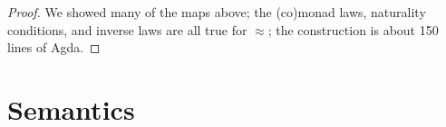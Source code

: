 \documentclass{drl-common/llncs}
\newcommand\ap[2]{\ensuremath{#1 \approx #2}}
\begin{document}
\begin{proof}
We showed many of the maps above; the (co)monad laws, naturality
conditions, and inverse laws are all true for \ap{}{}; the construction
is about 150 lines of Agda.
\end{proof}

\section{Semantics}
\label{sec:semantics}

\newcommand\semF[2]{\ensuremath{\mathcal{F}_{#1} \,\, #2}}
\newcommand\semU[2]{\ensuremath{\mathcal{U}_{#1} \,\, #2}}
\newcommand\semFo[1]{\ensuremath{{\mathcal{F}_{#1}}}}
\newcommand\semUo[1]{\ensuremath{\mathcal{U}_{#1}}}
\newcommand\semFone{\ensuremath{{\mathcal{F}^1}}}
\newcommand\semUone{\ensuremath{{\mathcal{U}^1}}}
\newcommand\semUcomp{\ensuremath{\mathcal{U}^\circ}}
\newcommand\semFcomp{\ensuremath{\mathcal{F}^\circ}}
\newcommand\semltor[2]{\ensuremath{#1^{\vartriangleright_{#2}}}}
\newcommand\semrtol[2]{\ensuremath{#1^{\vartriangleleft_{#2}}}}

\newcommand\seminl[0]{\ensuremath{\mathit{inl}}}
\newcommand\seminr[0]{\ensuremath{\mathit{inr}}}
\newcommand\semcase[2]{\ensuremath{[#1,#2]}}
\end{document}
